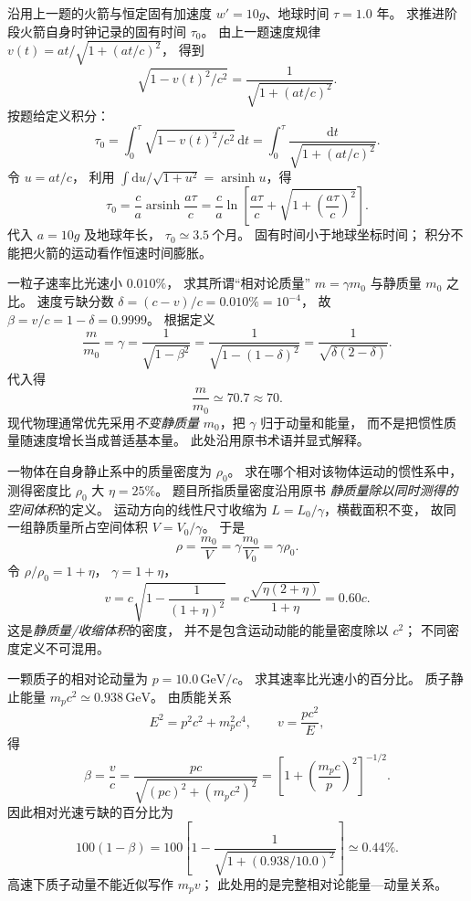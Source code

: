沿用上一题的火箭与恒定固有加速度
$w'=10g$、地球时间 $\tau=1.0$ 年。
求推进阶段火箭自身时钟记录的固有时间
$\tau_0$。
\exsolution
由上一题速度规律
$v(t)=at/\sqrt{1+(at/c)^2}$，
得到
\[
\sqrt{1-v(t)^2/c^2}
=\frac1{\sqrt{1+(at/c)^2}}.
\]
按题给定义积分：
\[
\tau_0=\int_0^\tau
\sqrt{1-v(t)^2/c^2}\,\mathrm dt
=\int_0^\tau\frac{\mathrm dt}
{\sqrt{1+(at/c)^2}}.
\]
令 $u=at/c$，
利用 $\int\mathrm du/\sqrt{1+u^2}
=\operatorname{arsinh}u$，得
\[
\boxed{\tau_0=\frac ca
\operatorname{arsinh}\frac{a\tau}{c}
=\frac ca\ln\left[
\frac{a\tau}{c}+
\sqrt{1+\left(\frac{a\tau}{c}\right)^2}\right]}.
\]
代入 $a=10g$ 及地球年长，
$\boxed{\tau_0\simeq3.5\ \text{个月}}$。
\excheck 固有时间小于地球坐标时间；
积分不能把火箭的运动看作恒速时间膨胀。

一粒子速率比光速小 $0.010\%$，
求其所谓“相对论质量”
$m=\gamma m_0$ 与静质量 $m_0$ 之比。
\exsolution
速度亏缺分数
$\delta=(c-v)/c=0.010\%=10^{-4}$，
故 $\beta=v/c=1-\delta=0.9999$。
根据定义
\[
\frac{m}{m_0}=\gamma
=\frac1{\sqrt{1-\beta^2}}
=\frac1{\sqrt{1-(1-\delta)^2}}
=\frac1{\sqrt{\delta(2-\delta)}}.
\]
代入得
\[
\boxed{\frac{m}{m_0}\simeq70.7\approx70}.
\]
\excheck 现代物理通常优先采用\emph{不变静质量}
$m_0$，把 $\gamma$ 归于动量和能量，
而不是把惯性质量随速度增长当成普适基本量。
此处沿用原书术语并显式解释。

一物体在自身静止系中的质量密度为
$\rho_0$。
求在哪个相对该物体运动的惯性系中，
测得密度比 $\rho_0$ 大
$\eta=25\%$。
\exsolution
题目所指质量密度沿用原书
\emph{静质量除以同时测得的空间体积}的定义。
运动方向的线性尺寸收缩为
$L=L_0/\gamma$，横截面积不变，
故同一组静质量所占空间体积
$V=V_0/\gamma$。
于是
\[
\rho=\frac{m_0}{V}
=\gamma\frac{m_0}{V_0}=\gamma\rho_0.
\]
令 $\rho/\rho_0=1+\eta$，
$\gamma=1+\eta$，
\[
\boxed{v=c\sqrt{1-\frac1{(1+\eta)^2}}
=c\frac{\sqrt{\eta(2+\eta)}}{1+\eta}
=0.60c}.
\]
\excheck 这是\emph{静质量/收缩体积}的密度，
并不是包含运动动能的能量密度除以 $c^2$；
不同密度定义不可混用。

一颗质子的相对论动量为
$p=10.0\,\mathrm{GeV}/c$。
求其速率比光速小的百分比。
\exsolution
质子静止能量
$m_pc^2\simeq0.938\,\mathrm{GeV}$。
由质能关系
\[
E^2=p^2c^2+m_p^2c^4,\qquad v=\frac{pc^2}{E},
\]
得
\[
\beta=\frac vc
=\frac{pc}{\sqrt{(pc)^2+(m_pc^2)^2}}
=\left[1+\left(\frac{m_pc}{p}\right)^2\right]^{-1/2}.
\]
因此相对光速亏缺的百分比为
\[
\boxed{100(1-\beta)=100
\left[1-
\frac{1}{\sqrt{1+(0.938/10.0)^2}}\right]
\simeq0.44\%}.
\]
\excheck 高速下质子动量不能近似写作 $m_pv$；
此处用的是完整相对论能量—动量关系。
